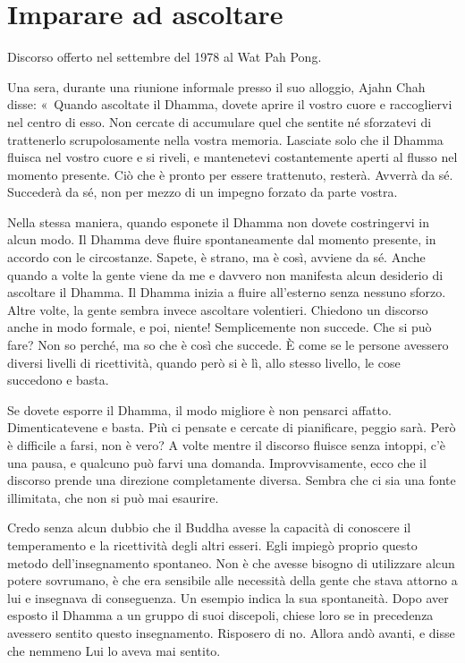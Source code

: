 \chapter{Imparare ad ascoltare}

\begin{openingQuote}
  Discorso offerto nel settembre del 1978 al Wat Pah Pong.
\end{openingQuote}

Una sera, durante una riunione informale presso il suo alloggio, Ajahn
Chah disse: «~Quando ascoltate il Dhamma, dovete aprire il vostro cuore
e raccogliervi nel centro di esso. Non cercate di accumulare quel che
sentite né sforzatevi di trattenerlo scrupolosamente nella vostra
memoria. Lasciate solo che il Dhamma fluisca nel vostro cuore e si
riveli, e mantenetevi costantemente aperti al flusso nel momento
presente. Ciò che è pronto per essere trattenuto, resterà. Avverrà da
sé. Succederà da sé, non per mezzo di un impegno forzato da parte
vostra.

Nella stessa maniera, quando esponete il Dhamma non dovete costringervi
in alcun modo. Il Dhamma deve fluire spontaneamente dal momento
presente, in accordo con le circostanze. Sapete, è strano, ma è così,
avviene da sé. Anche quando a volte la gente viene da me e davvero non
manifesta alcun desiderio di ascoltare il Dhamma. Il Dhamma inizia a
fluire all'esterno senza nessuno sforzo. Altre volte, la gente sembra
invece ascoltare volentieri. Chiedono un discorso anche in modo formale,
e poi, niente! Semplicemente non succede. Che si può fare? Non so
perché, ma so che è così che succede. È come se le persone avessero
diversi livelli di ricettività, quando però si è lì, allo stesso
livello, le cose succedono e basta.

Se dovete esporre il Dhamma, il modo migliore è non pensarci affatto.
Dimenticatevene e basta. Più ci pensate e cercate di pianificare, peggio
sarà. Però è difficile a farsi, non è vero? A volte mentre il discorso
fluisce senza intoppi, c'è una pausa, e qualcuno può farvi una domanda.
Improvvisamente, ecco che il discorso prende una direzione completamente
diversa. Sembra che ci sia una fonte illimitata, che non si può mai
esaurire.

Credo senza alcun dubbio che il Buddha avesse la capacità di conoscere
il temperamento e la ricettività degli altri esseri. Egli impiegò
proprio questo metodo dell'insegnamento spontaneo. Non è che avesse
bisogno di utilizzare alcun potere sovrumano, è che era sensibile alle
necessità della gente che stava attorno a lui e insegnava di
conseguenza. Un esempio indica la sua spontaneità. Dopo aver esposto il
Dhamma a un gruppo di suoi discepoli, chiese loro se in precedenza
avessero sentito questo insegnamento. Risposero di no. Allora andò
avanti, e disse che nemmeno Lui lo aveva mai sentito.

